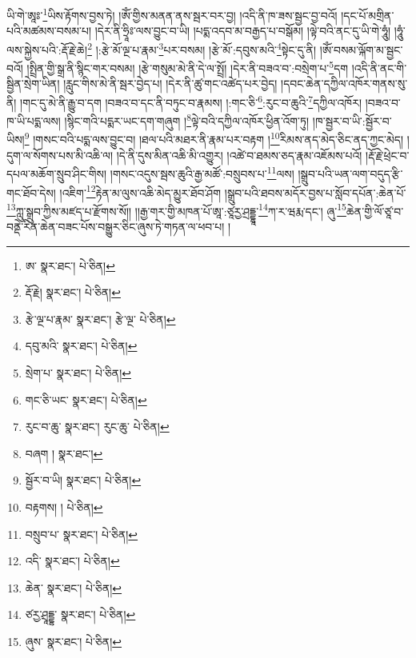 ཡི་གེ་ཨཱཿ་\footnote{ཨ་  སྣར་ཐང་།  པེ་ཅིན། }ཡིས་རྟོགས་བྱས་ཏེ། །ཨོཾ་གྱིས་མནན་ནས་སྦར་བར་བྱ། །འདི་ནི་ཁ་ཟས་སྦྱང་བྱ་བའོ། །དང་པོ་མགྲིན་པའི་མཚམས་བསམ་པ། །དེར་ནི་ཧྲཱིཿ་ལས་བྱུང་བ་ཡི། །པདྨ་འདབ་མ་བརྒྱད་པ་བསྒོམ། །ལྟེ་བའི་ནང་དུ་ཡི་གེ་ཧཱུཾ། །ཧཱུཾ་ལས་སྐྱེས་པའི་:རྡོ་རྗེ་ཆེ།\footnote{རྡོ་རྗེ།  སྣར་ཐང་།  པེ་ཅིན། } །:རྩེ་མོ་ལྔ་པ་རྣམ་\footnote{རྩེ་ལྔ་པ་རྣམ་  སྣར་ཐང་། རྩེ་ལྔ་  པེ་ཅིན། }པར་བསམ། །རྩེ་མོ་:དབུས་མའི་\footnote{དབུ་མའི་  སྣར་ཐང་།  པེ་ཅིན། }སྟེང་དུ་ནི། །ཨོཾ་བསམ་ལྐོག་མ་སྦྱང་བའོ། །སྤྲིན་གྱི་སྒྲ་ནི་སྙིང་གར་བསམ། །རྩེ་གསུམ་མེ་ནི་དེ་ལ་སྤྲོ། །དེར་ནི་བཟའ་བ་:བསྲེག་པ་\footnote{སྲེག་པ་  སྣར་ཐང་།  པེ་ཅིན། }དག །འདི་ནི་ནང་གི་སྦྱིན་སྲེག་ཡིན། །རླུང་གིས་མེ་ནི་སྦར་བྱེད་པ། །དེར་ནི་ཚུ་གང་འཚེད་པར་བྱེད། །དབང་ཆེན་དཀྱིལ་འཁོར་གནས་སུ་ནི། །གང་དུ་མེ་ནི་རྒྱུ་བ་དག །བཟའ་བ་དང་ནི་བཏུང་བ་རྣམས། །:གང་ཅི་\footnote{གང་ཅི་ཡང་  སྣར་ཐང་།  པེ་ཅིན། }:རུང་བ་ཆུའི་\footnote{རུང་བ་ཆུ་  སྣར་ཐང་། རུང་ཆུ་  པེ་ཅིན། }དཀྱིལ་འཁོར། །བཟའ་བ་ཁ་ཡི་པདྨ་ལས། །སྙིང་གའི་པདྨར་ཡང་དག་གཞུག །\footnote{བཞག །  སྣར་ཐང་། }ལྟེ་བའི་དཀྱིལ་འཁོར་ཕྱིན་འོག་ཏུ། །ཁ་སྦྱར་བ་ཡི་:སྦྱོར་བ་ཡིས།\footnote{སྦྱོར་བ་ཡི།  སྣར་ཐང་།  པེ་ཅིན། } །གསང་བའི་པདྨ་ལས་བྱུང་བ། །ཐལ་པའི་མཐར་ནི་རྣམ་པར་བརྟག །\footnote{བརྟགས། །  པེ་ཅིན། }རིམས་ནད་མེད་ཅིང་ནད་ཀྱང་མེད། །དུག་ལ་སོགས་པས་མི་འཆི་ལ། །དེ་ནི་དུས་མིན་འཆི་མི་འགྱུར། །འཚེ་བ་ཐམས་ཅད་རྣམ་འཇོམས་པའོ། །རྡོ་རྗེ་ཕྲེང་བ་དཔལ་མཆོག་སྲུབ་ཤིང་གིས། །གསང་འདུས་སྦས་ཆུའི་རྒྱ་མཚོ་:བསྲུབས་པ་\footnote{བསྲུབ་པ་  སྣར་ཐང་།  པེ་ཅིན། }ལས། །སྒྲུབ་པའི་ཡན་ལག་བདུད་རྩི་གང་ཐོབ་དེས། །འཇིག་\footnote{འདི་  སྣར་ཐང་།  པེ་ཅིན། }རྟེན་མ་ལུས་འཆི་མེད་མྱུར་ཐོབ་ཤོག །སྒྲུབ་པའི་ཐབས་མདོར་བྱས་པ་སློབ་དཔོན་:ཆེན་པོ་\footnote{ཆེན་  སྣར་ཐང་།  པེ་ཅིན། }ཀླུ་སྒྲུབ་ཀྱིས་མཛད་པ་རྫོགས་སོ།། །།རྒྱ་གར་གྱི་མཁན་པོ་ཨཱ་:ཙཱརྱ་ཤྲདྡྷཱ་\footnote{ཙརྱ་ཤྲཱདྡྷ་  སྣར་ཐང་།  པེ་ཅིན། }ཀ་ར་ཝརྨ་དང་། ཞུ་\footnote{ཞུས་  སྣར་ཐང་།  པེ་ཅིན། }ཆེན་གྱི་ལོ་ཙཱ་བ་བནྡེ་རིན་ཆེན་བཟང་པོས་བསྒྱུར་ཅིང་ཞུས་ཏེ་གཏན་ལ་ཕབ་པ། ། 